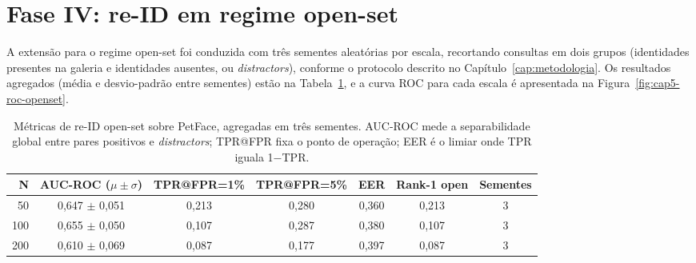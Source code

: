 \section{Fase IV: re-ID em regime open-set}
\label{sec:res-reid-openset}

A extensão para o regime open-set foi conduzida com três sementes aleatórias por escala, recortando consultas em dois grupos (identidades presentes na galeria e identidades ausentes, ou \textit{distractors}), conforme o protocolo descrito no Capítulo~\ref{cap:metodologia}. Os resultados agregados (média e desvio-padrão entre sementes) estão na Tabela~\ref{tab:cap5-reid-openset}, e a curva ROC para cada escala é apresentada na Figura~\ref{fig:cap5-roc-openset}.

\begin{table}[!htb]
  \centering
  \caption[Métricas de re-ID open-set sobre PetFace.]{Métricas de re-ID open-set sobre PetFace, agregadas em três sementes. AUC-ROC mede a separabilidade global entre pares positivos e \textit{distractors}; TPR@FPR fixa o ponto de operação; EER é o limiar onde TPR iguala 1$-$TPR.}
  \label{tab:cap5-reid-openset}
  \begin{tabular}{rcccccc}
    \toprule
    \textbf{N} & \textbf{AUC-ROC ($\mu\pm\sigma$)} & \textbf{TPR@FPR=1\%} & \textbf{TPR@FPR=5\%} & \textbf{EER} & \textbf{Rank-1 open} & \textbf{Sementes} \\
    \midrule
    50  & 0,647 $\pm$ 0,051 & 0,213 & 0,280 & 0,360 & 0,213 & 3 \\
    100 & 0,655 $\pm$ 0,050 & 0,107 & 0,287 & 0,380 & 0,107 & 3 \\
    200 & 0,610 $\pm$ 0,069 & 0,087 & 0,177 & 0,397 & 0,087 & 3 \\
    \bottomrule
  \end{tabular}
\end{table}

